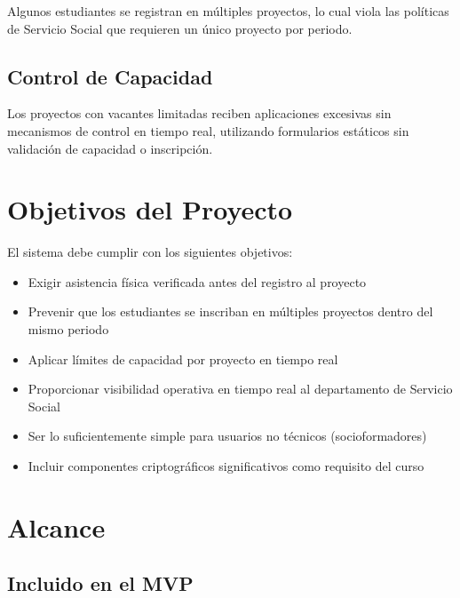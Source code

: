 \documentclass[12pt,a4paper]{article}
\begin{document}
Algunos estudiantes se registran en múltiples proyectos, lo cual viola las políticas de Servicio Social que requieren un único proyecto por periodo.

\subsection{Control de Capacidad}

Los proyectos con vacantes limitadas reciben aplicaciones excesivas sin mecanismos de control en tiempo real, utilizando formularios estáticos sin validación de capacidad o inscripción.

\section{Objetivos del Proyecto}

El sistema debe cumplir con los siguientes objetivos:

\begin{itemize}[leftmargin=*]
    \item Exigir asistencia física verificada antes del registro al proyecto
    \item Prevenir que los estudiantes se inscriban en múltiples proyectos dentro del mismo periodo
    \item Aplicar límites de capacidad por proyecto en tiempo real
    \item Proporcionar visibilidad operativa en tiempo real al departamento de Servicio Social
    \item Ser lo suficientemente simple para usuarios no técnicos (socioformadores)
    \item Incluir componentes criptográficos significativos como requisito del curso
\end{itemize}

\section{Alcance}

\subsection{Incluido en el MVP}
\end{document}
